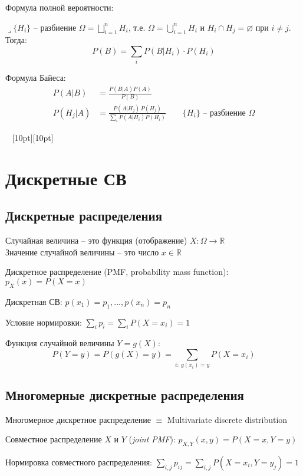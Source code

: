 \documentclass[a4paper,12pt,fleqn]{article}
\numberwithin{figure}{section}
\theoremstyle{definition}
\def\R{\mathbb{R}}
\def\on{\!:}
\def\lets{{\huge$\lrcorner$}\space}
\def\vignette{\vspace{48pt} \noindent \hrulefill~
	          \raisebox{-8pt}[10pt][10pt]{\Huge\ding{102}}
	          ~\hrulefill}
\begin{document}
Формула полной вероятности:

\lets $\{H_i\}$ -- разбиение $\Omega = \bigsqcup_{i=1}^n H_i$, т.е.
$\Omega = \bigcup_{i=1}^n H_i$ и $H_i \cap H_j = \varnothing$ при $i \ne j$.
Тогда:
\[ P(B) = \sum_i P(B|H_i) \cdot P(H_i)  \]

Формула Байеса:
\begin{align*}
P(A|B) &= \frac{P(B|A) P(A)}{P(B)} \\
P(H_j|A) &= \frac{P(A|H_j)\,P(H_j)}{\sum_i P(A|H_i) P(H_i)}
			\qquad \{H_i\} \text{ -- разбиение } \Omega
\end{align*}


\vignette
\section{Дискретные СВ}

\subsection{Дискретные распределения}

Случайная величина -- это функция (отображение) $X\on \Omega\to\R$ \\
Значение случайной величины -- это число $x\in\R$

Дискретное распределение (PMF, probability mass function): $p_X(x)=P(X=x)$

Дискретная СВ: $p(x_1)=p_1, ..., p(x_n)=p_n$

Условие нормировки: $\sum_i p_i = \sum_i P(X=x_i)=1$

Функция случайной величины $Y=g(X)$:
\[ P(Y=y) = P(g(X)=y) = \sum_{i:\: g(x_i)=y}P(X=x_i) \]


\subsection{Многомерные дискретные распределения}

Многомерное дискретное распределение $\equiv$ Multivariate discrete distribution

Совместное распределение $X$ и $Y$ (\textit{joint PMF}): $p_{X,Y}(x,y)=P(X=x,Y=y)$

Нормировка совместного распределения:
$\sum_{i,j}p_{ij} = \sum_{i,j} P(X=x_i,Y=y_j) = 1$
\end{document}
